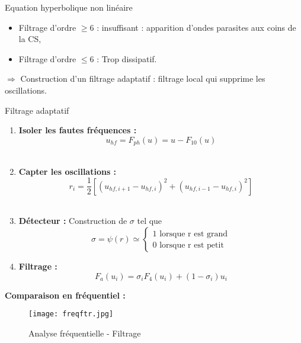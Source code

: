 \documentclass[11pt]{beamer}
\begin{document}
\begin{frame}

\begin{block}{}
Equation hyperbolique non linéaire
\end{block}

\pause
\begin{itemize}
\item 
Filtrage d'ordre $\geq 6$ : insuffisant : apparition d'ondes parasites aux coins de la CS,

\item Filtrage d'ordre $\leq 6$ : Trop dissipatif.
\end{itemize}

$\Rightarrow$ Construction d'un filtrage adaptatif : filtrage local qui supprime les oscillations.

\end{frame}


\begin{frame}{Filtrage adaptatif}

\begin{enumerate}
\item \textbf{Isoler les fautes fréquences :}
$$u_{hf} = F_{ph} (u) = u - F_{10} (u)$$\\
\item \textbf{Capter les oscillations :}
$$r_i = \dfrac{1}{2}\left[ \left( u_{hf,i+1} - u_{hf,i} \right)^2 + \left( u_{hf,i-1} - u_{hf,i}  \right)^2 \right]$$\\
\item \textbf{Détecteur :} Construction de $\sigma$ tel que
$$\sigma = \psi ( r ) \simeq \left\lbrace
\begin{array}{c}
 1 \text{ lorsque r est grand}\\
 0 \text{ lorsque r est petit}
\end{array}
\right.$$
\item \textbf{Filtrage :}
$$F_a(u_{i}) = \sigma_i F_{4}(u_i) + (1-\sigma_i) u_i$$

\end{enumerate}
\end{frame}

\begin{frame}
\textbf{Comparaison en fréquentiel :}
\begin{figure}
\begin{center}
\texttt{[image: freqftr.jpg]}
\end{center}
\caption{Analyse fréquentielle - Filtrage}
\end{figure}
\end{frame}
\end{document}
